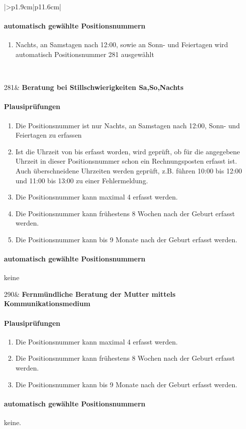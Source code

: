 \begin{mpsupertabular}{|>{\centering}p{1.9cm}|p{11.6cm}|}
\paragraph{automatisch gewählte Positionsnummern}
\begin{enumerate}
\item
Nachts, an Samstagen nach 12:00, sowie an Sonn- und Feiertagen wird
automatisch Positionsnummer 281 ausgewählt
\end{enumerate}
\\ \hline


281&
\textbf{Beratung bei Stillschwierigkeiten Sa,So,Nachts}
\paragraph{Plausiprüfungen}
\begin{enumerate}
\item
Die Positionsnummer ist nur Nachts, an Samstagen nach 12:00, 
Sonn- und Feiertagen zu erfassen
\item
Ist die Uhrzeit von bis erfasst worden, wird geprüft, ob für die angegebene 
Uhrzeit in dieser Positionsnummer
schon ein Rechnungsposten erfasst ist. Auch überschneidene Uhrzeiten
werden geprüft, z.B. führen 10:00 bis 12:00 und 11:00 bis 13:00 zu einer
Fehlermeldung.
\item
Die Positionsnummer kann maximal 4 erfasst werden.
\item
Die Positionsnummer kann frühestens 8 Wochen nach der Geburt erfasst werden.
\item
Die Positionsnummer kann bis  9 Monate nach der Geburt erfasst werden.
\end{enumerate}
\paragraph{automatisch gewählte Positionsnummern}
keine
\\ \hline
 

290&
\textbf{Fernmündliche Beratung der Mutter mittels Kommunikationsmedium}
\paragraph{Plausiprüfungen}
\begin{enumerate}
\item
Die Positionsnummer kann maximal 4 erfasst werden.
\item
Die Positionsnummer kann frühestens 8 Wochen nach der Geburt erfasst werden.
\item
Die Positionsnummer kann bis 9 Monate nach der Geburt erfasst
werden.
\end{enumerate}
\paragraph{automatisch gewählte Positionsnummern}
keine.
\\ \hline

\end{mpsupertabular}



